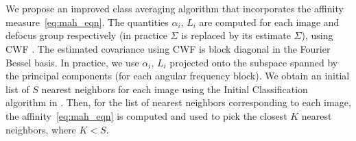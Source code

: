 We propose an improved class averaging algorithm that incorporates the affinity measure~\eqref{eq:mah_eqn}. The quantities $\alpha_i$, $L_i$ are computed for each image and defocus group respectively (in practice $\Sigma$ is replaced by its estimate $\hat{\Sigma}$), using CWF \cite{Bhamre2016}. The estimated covariance using CWF is block diagonal in the Fourier Bessel basis. In practice, we use $\alpha_i$, $L_i$ projected onto the subspace spanned by the principal components (for each angular frequency block). We obtain an initial list of $S$ nearest neighbors for each image using the Initial Classification algorithm in \cite{zhao}. Then, for the list of nearest neighbors corresponding to each image, the affinity~\eqref{eq:mah_eqn} is computed and used to pick the closest $K$ nearest neighbors, where $K<S$. 
%

